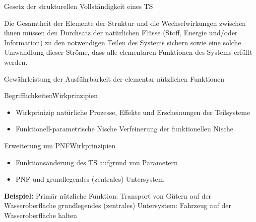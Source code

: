 \documentclass[aspectratio=169]{beamer}
\begin{document}
    \begin{frame}{Gesetz der strukturellen Vollständigkeit eines TS}
        \begin{center}
            Die Gesamtheit der Elemente der Struktur und die Wechselwirkungen zwischen ihnen müssen den Durchsatz der natürlichen Flüsse (Stoff,
            Energie und/oder Information) zu den notwendigen Teilen des Systems sichern
            sowie eine solche Umwandlung dieser Ströme, dass alle elementaren Funktionen
            des Systems erfüllt werden.
        \end{center}
        \vfill
        \begin{center}
            Gewährleistung der Ausführbarkeit der elementar nützlichen Funktionen
        \end{center}
    \end{frame}

    \begin{frame}{Begrifflichkeiten}{Wirkprinzipien}
        \begin{itemize}
            \item Wirkprinizip \newline
            {\scriptsize natürliche Prozesse, Effekte und Erscheinungen der Teilsysteme}
        \end{itemize}

        \vfill

        \begin{itemize}
            \item Funktionell-parametrische Nische \newline
            {\scriptsize Verfeinerung der funktionellen Nische}
        \end{itemize}
    \end{frame}

    \begin{frame}{Erweiterung um PNF}{Wirkprinzipien}
        \begin{itemize}
            \item Funktionsänderung des TS aufgrund von Parametern
            \item PNF und grundlegendes (zentrales) Untersystem
        \end{itemize}
        \vfill
        \textbf{Beispiel:} \newline
        Primär nützliche Funktion: \hfill Transport von Gütern auf der Wasseroberfläche \newline
        grundlegendes (zentrales) Untersystem: Fahrzeug auf der Wasseroberfläche halten
    \end{frame}
\end{document}
